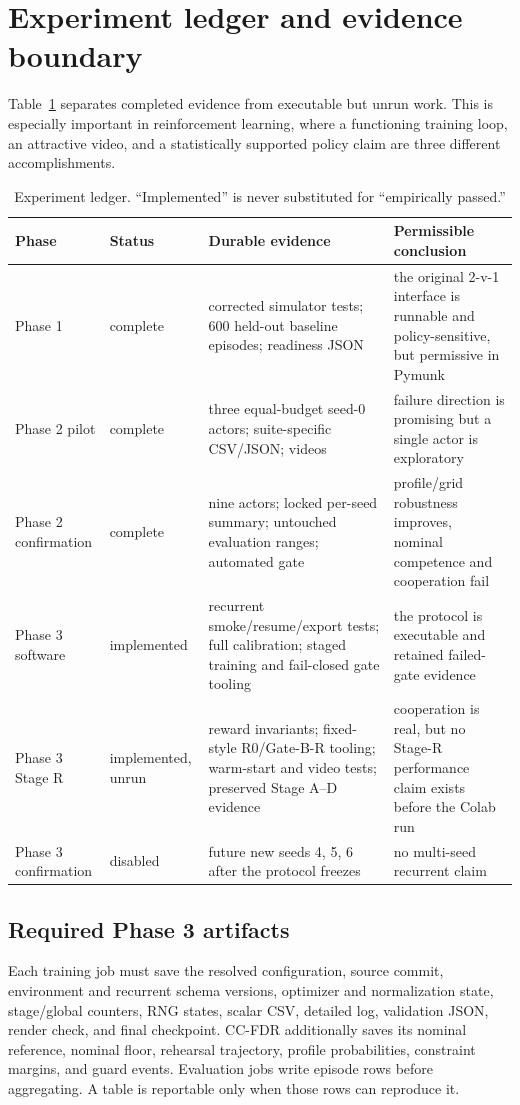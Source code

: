 \documentclass[12pt,twocolumn]{article}
\begin{document}
\section{Experiment ledger and evidence boundary}
Table~\ref{tab:ledger} separates completed evidence from executable but unrun work. This is
especially important in reinforcement learning, where a functioning training loop, an attractive
video, and a statistically supported policy claim are three different accomplishments.
\begin{table}[t]
\centering
\small
\begin{tabular}{p{}p{}p{}p{}}
\toprule Phase & Status & Durable evidence & Permissible conclusion \\
\midrule
Phase 1 & complete & corrected simulator tests; 600 held-out baseline episodes; readiness JSON &
the original 2-v-1 interface is runnable and policy-sensitive, but permissive in Pymunk \\
Phase 2 pilot & complete & three equal-budget seed-0 actors; suite-specific CSV/JSON; videos &
failure direction is promising but a single actor is exploratory \\
Phase 2 confirmation & complete & nine actors; locked per-seed summary; untouched evaluation
ranges; automated gate & profile/grid robustness improves, nominal competence and cooperation fail \\
Phase 3 software & implemented & recurrent smoke/resume/export tests; full calibration; staged
training and fail-closed gate tooling & the protocol is executable and retained failed-gate
evidence \\
Phase 3 Stage R & implemented, unrun & reward invariants; fixed-style R0/Gate-B-R tooling;
warm-start and video tests; preserved Stage A--D evidence & cooperation is real, but no Stage-R
performance claim exists before the Colab run \\
Phase 3 confirmation & disabled & future new seeds 4, 5, 6 after the protocol freezes & no
multi-seed recurrent claim \\
\bottomrule
\end{tabular}
\caption{Experiment ledger. ``Implemented'' is never substituted for ``empirically passed.''}
\label{tab:ledger}
\end{table}

\subsection{Required Phase 3 artifacts}
Each training job must save the resolved configuration, source commit, environment and recurrent
schema versions, optimizer and normalization state, stage/global counters, RNG states, scalar CSV,
detailed log, validation JSON, render check, and final checkpoint. CC-FDR additionally saves its
nominal reference, nominal floor, rehearsal trajectory, profile probabilities, constraint margins,
and guard events. Evaluation jobs write episode rows before aggregating. A table is reportable only
when those rows can reproduce it.
\end{document}

